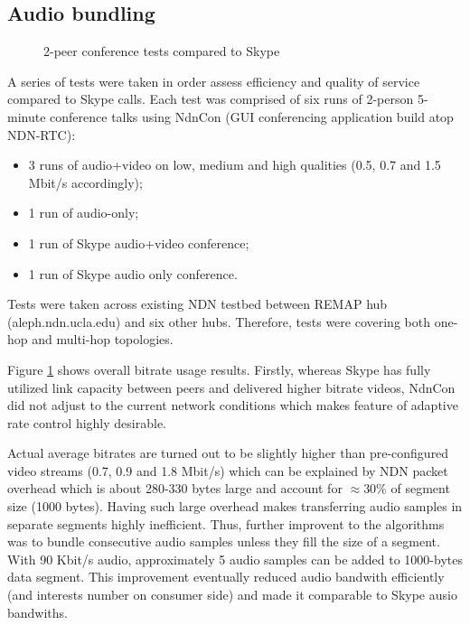 \documentclass{icn/sig-alternate-2012} %
\newcommand{\ndnrtcName}{NDN-RTC} %
\begin{document}
\subsection{Audio bundling}
\begin{figure}[t!]
\centering
\begin{tiny}
\def\svgwidth{0.5\textwidth}
\end{tiny}
\vspace{-18pt}
\caption{2-peer conference tests compared to Skype}
\label{fig:tests-skype}
\end{figure}

A series of tests were taken in order assess efficiency and quality of service compared to Skype calls. Each test was comprised of six runs of 2-person 5-minute conference talks using NdnCon (GUI conferencing application build atop \ndnrtcName{}):
\begin{itemize}
\item 3 runs of audio+video on low, medium and high qualities (0.5, 0.7 and 1.5 Mbit/s accordingly);
\item 1 run of audio-only;
\item 1 run of Skype audio+video conference;
\item 1 run of Skype audio only conference.
\end{itemize}

Tests were taken across existing NDN testbed between REMAP hub (aleph.ndn.ucla.edu) and six other hubs. Therefore, tests were covering both one-hop and multi-hop topologies.

Figure \ref{fig:tests-skype} shows overall bitrate usage results. Firstly, whereas Skype has fully utilized link capacity between peers and delivered higher bitrate videos, NdnCon did not adjust to the current network conditions which makes feature of adaptive rate control highly desirable.

Actual average bitrates are turned out to be slightly higher than pre-configured video streams (0.7, 0.9 and 1.8 Mbit/s) which can be explained by NDN packet overhead which is about 280-330 bytes large and account for $\approx$30\% of segment size (1000 bytes). Having such large overhead makes transferring audio samples in separate segments highly inefficient. Thus, further improvent to the algorithms was to bundle consecutive audio samples unless they fill the size of a segment. With 90 Kbit/s audio, approximately 5 audio samples can be added to 1000-bytes data segment. This improvement eventually reduced audio bandwith efficiently (and interests number on consumer side) and made it comparable to Skype ausio bandwiths.
\end{document}

